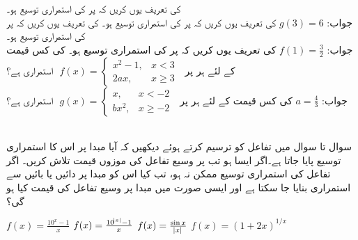  کی تعریف یوں کریں کہ  پر  کی  استمراری توسیع  ہو۔\\
جواب:\quad 
$g(3)=6$
 کی تعریف یوں کریں کہ  پر  کی  استمراری توسیع  ہو۔
 کی تعریف یوں کریں کہ  پر  کی  استمراری توسیع  ہو۔\\
جواب:\quad
$f(1)=\tfrac{3}{2}$
 کی تعریف یوں کریں کہ  پر  کی  استمراری توسیع  ہو۔
 کی کس قیمت کے لئے ہر  پر 
$\,\,f(x)=\begin{cases} x^2-1,&x<3\\ 2ax,&x\ge 3  \end{cases}\,\,$
استمراری ہے؟\\
جواب:\quad
$a=\tfrac{4}{3}$
 کی کس قیمت کے لئے ہر  پر 
$\,\,g(x)=\begin{cases} x,&x<-2\\ bx^2,&x\ge -2  \end{cases}\,\,$
استمراری ہے؟

\\
سوال  تا سوال  میں تفاعل  کو ترسیم کرتے ہوئے دیکھیں کہ آیا  مبدا پر اس کا استمراری توسیع پایا جاتا ہے۔اگر ایسا ہو تب  پر وسیع تفاعل کی موزوں قیمت تلاش کریں۔ اگر تفاعل کی استمراری توسیع  ممکن نہ ہو، تب کیا اس کو مبدا پر دائیں یا بائیں سے استمراری بنایا جا سکتا ہے اور ایسی صورت میں مبدا پر وسیع تفاعل کی قیمت کیا ہو گی؟

$f(x)=\tfrac{10^x-1}{x}$
$f(x)=\tfrac{10^{\abs{x}}-1}{x}$
$f(x)=\tfrac{\sin x}{\abs{x}}$
$f(x)=(1+2x)^{1/x}$


